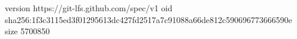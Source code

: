 version https://git-lfs.github.com/spec/v1
oid sha256:1f3c3115ed3f01295613dc427fd2517a7c91088a66de812c590696773666590e
size 5700850
